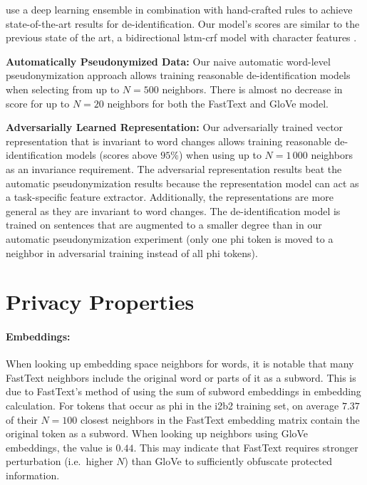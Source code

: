 %
\citet{liu2017identification} use a deep learning ensemble in combination with hand-crafted rules to achieve state-of-the-art results for de-identification.
%
Our model's scores are similar to the previous state of the art, a bidirectional \ac{lstm}-\ac{crf} model with character features \citep{dernoncourt2017identification}.

\textbf{Automatically Pseudonymized Data:}
%
Our naive automatic word-level pseudonymization approach allows training reasonable de-identification models when selecting from up to $N=500$ neighbors.
%
There is almost no decrease in \fone score for up to $N = 20$ neighbors for both the FastText and GloVe model.

\textbf{Adversarially Learned Representation:}
%
Our adversarially trained vector representation that is invariant to word changes allows training reasonable de-identification models (\fone scores above $95\%$) when using up to $N=1\,000$ neighbors as an invariance requirement.
%
The adversarial representation results beat the automatic pseudonymization results because the representation model can act as a task-specific feature extractor.
%
Additionally, the representations are more general as they are invariant to word changes.
%
The de-identification model is trained on sentences that are augmented to a smaller degree than in our automatic pseudonymization experiment (only one \ac{phi} token is moved to a neighbor in adversarial training instead of all \ac{phi} tokens).

\section{Privacy Properties}

\paragraph{Embeddings:}
%
When looking up embedding space neighbors for words, it is notable that many FastText neighbors include the original word or parts of it as a subword.
%
This is due to FastText's method of using the sum of subword embeddings in embedding calculation.
%
For tokens that occur as \ac{phi} in the i2b2 training set, on average $7.37$ of their $N=100$ closest neighbors in the FastText embedding matrix contain the original token as a subword.
%
When looking up neighbors using GloVe embeddings, the value is $0.44$.
%
This may indicate that FastText requires stronger perturbation (i.e.\ higher $N$) than GloVe to sufficiently obfuscate protected information.

